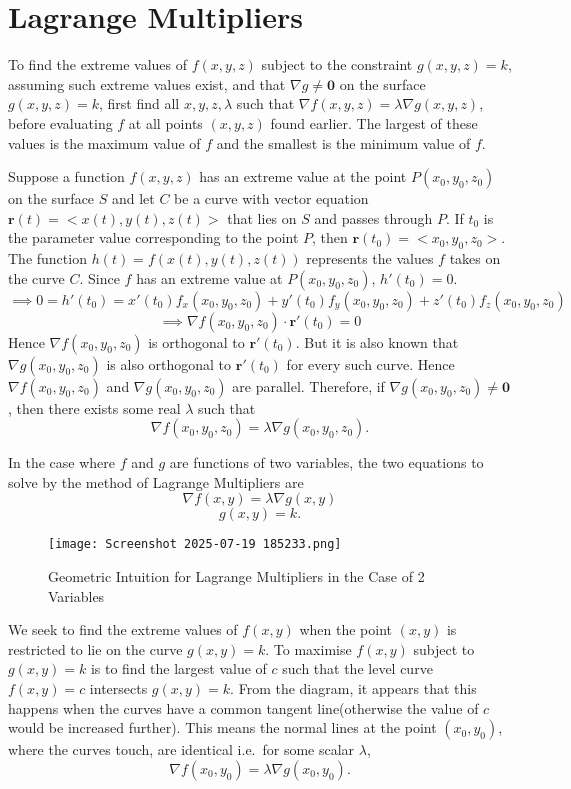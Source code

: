 \documentclass{article}
\begin{document}
\section{Lagrange Multipliers}
\begin{theorem}
    To find the extreme values of $f(x,y,z)$ subject to the constraint $g(x,y,z)=k$, assuming such extreme values exist, and that $\nabla g\neq \bm{0}$ on the surface $g(x,y,z)=k$, first find all $x,y,z,\lambda$ such that $\nabla f(x,y,z)=\lambda\nabla g(x,y,z)$, before evaluating $f$ at all points $(x,y,z)$ found earlier. The largest of these values is the maximum value of $f$ and the smallest is the minimum value of $f$.
\end{theorem}
\begin{replacementproof}
    Suppose a function $f(x,y,z)$ has an extreme value at the point $P(x_0,y_0,z_0)$ on the surface $S$ and let $C$ be a curve with vector equation $\bm{r}(t)=\Big<x(t),y(t),z(t)\Big>$ that lies on $S$ and passes through $P$. If $t_0$ is the parameter value corresponding to the point $P$, then $\bm{r}(t_0)=\Big<x_0,y_0,z_0\Big>$. The function $h(t)=f(x(t),y(t),z(t))$ represents the values $f$ takes on the curve $C$. Since $f$ has an extreme value at $P(x_0,y_0,z_0)$, $h'(t_0)=0.$
    $$\implies0=h'(t_0)=x'(t_0)f_x(x_0,y_0,z_0)+y'(t_0)f_y(x_0,y_0,z_0)+z'(t_0)f_z(x_0,y_0,z_0)$$
    $$\implies\nabla f(x_0,y_0,z_0)\cdot\bm{r}'(t_0)=0$$
    Hence $\nabla f(x_0,y_0,z_0)$ is orthogonal to $\bm{r}'(t_0)$. But it is also known that $\nabla g(x_0,y_0,z_0)$ is also orthogonal to $\bm{r}'(t_0)$ for every such curve. Hence $\nabla f(x_0,y_0,z_0)$ and $\nabla g(x_0,y_0,z_0)$ are parallel. Therefore, if $\nabla g(x_0,y_0,z_0)\neq \bm{0}$, then there exists some real $\lambda$ such that
    $$\nabla f(x_0,y_0,z_0)=\lambda\nabla g(x_0,y_0,z_0).$$
\end{replacementproof}

In the case where $f$ and $g$ are functions of two variables, the two equations to solve by the method of Lagrange Multipliers are
$$\nabla f(x,y)=\lambda\nabla g(x,y)$$
$$g(x,y)=k.$$

 \begin{figure}[h]
    \centering
    \texttt{[image: Screenshot 2025-07-19 185233.png]}
    \caption{Geometric Intuition for Lagrange Multipliers in the Case of 2 Variables}
 \end{figure}
\begin{intuition}
    We seek to find the extreme values of $f(x,y)$ when the point $(x,y)$ is restricted to lie on the curve $g(x,y)=k$. To maximise $f(x,y)$ subject to $g(x,y)=k$ is to find the largest value of $c$ such that the level curve $f(x,y)=c$ intersects $g(x,y)=k.$ From the diagram, it appears that this happens when the curves have a common tangent line(otherwise the value of $c$ would be increased further). This means the normal lines at the point $(x_0,y_0)$, where the curves touch, are identical i.e.\ for some scalar $\lambda$, 
    $$\nabla f(x_0,y_0)=\lambda \nabla g(x_0,y_0).$$
\end{intuition}
\end{document}
